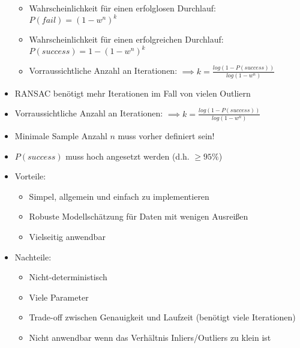 \documentclass[paper=a4, fontsize=11pt]{scrartcl} %
\numberwithin{equation}{section} %
\numberwithin{figure}{section} %
\numberwithin{table}{section} %
\begin{document}
\begin{itemize}
\begin{itemize}
\item Wahrscheinlichkeit für einen erfolglosen Durchlauf: $P(fail) = (1-w^n)^k$
\item Wahrscheinlichkeit für einen erfolgreichen Durchlauf: $P(success) = 1 - (1-w^n)^k$
\item Vorraussichtliche Anzahl an Iterationen: $\implies k = \frac{log(1-P(success))}{log(1-w^n)}$
\end{itemize}
\item RANSAC benötigt mehr Iterationen im Fall von vielen Outliern
\item Vorraussichtliche Anzahl an Iterationen: $\implies k = \frac{log(1-P(success))}{log(1-w^n)}$
\item Minimale Sample Anzahl $n$ muss vorher definiert sein!
\item $P(success)$ muss hoch angesetzt werden (d.h. $\ge 95\%$)
\item Vorteile:
\begin{itemize}
\item Simpel, allgemein und einfach zu implementieren
\item Robuste Modellschätzung für Daten mit wenigen Ausreißen
\item Vielseitig anwendbar
\end{itemize}
\item Nachteile:
\begin{itemize}
\item Nicht-deterministisch
\item Viele Parameter
\item Trade-off zwischen Genauigkeit und Laufzeit (benötigt viele Iterationen)
\item Nicht anwendbar wenn das Verhältnis Inliers/Outliers zu klein ist
\end{itemize}
\end{itemize}
\end{document}
